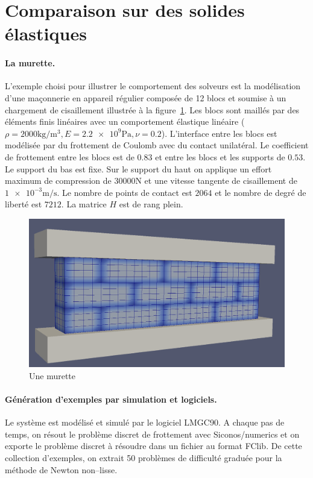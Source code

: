 \documentclass{CSMA2017}
\newcommand\red[1]{\textcolor{red}{#1}}
\begin{document}
\section{Comparaison sur des solides élastiques}

\paragraph{La murette.}
L'exemple choisi pour illustrer le comportement des solveurs est la modélisation d'une maçonnerie en appareil régulier composée de 12 blocs et soumise à un chargement de cisaillement illustrée à la figure~\ref{fig:LowWall_FEM}. Les blocs sont maillés par des éléments finis linéaires avec un comportement élastique linéaire ($\rho= \num{2000}\si{\kilogram\per\cubic\metre}, E=\num{2.2e+9}\si{\pascal} ,\nu = 0.2$). L'interface entre les blocs est modélisée par du frottement de Coulomb avec du contact unilatéral.  Le coefficient de frottement entre les blocs est de $0.83$ et entre les blocs et les supports de $0.53$. Le support du bas est fixe. Sur le support du haut on applique un effort  maximum de compression de $30000 \si{\newton}$ et une vitesse tangente de cisaillement de $\num{1e-3}\si{\meter\per\second}$.
\marginpar{\red{verifier la description. nombre et type d'éléments}} Le nombre de points de contact est $2064$ et le nombre de degré de liberté est $7212$. La matrice $H$ est de rang plein.
\begin{figure}[htbp]
  \centering
  \includegraphics[height=0.2\textheight]{./figure/LowWall_FEM.png}
  \caption{Une murette}
  \label{fig:LowWall_FEM}
\end{figure}

\paragraph{Génération d'exemples par simulation et logiciels.}
Le système est modélisé et simulé par le logiciel LMGC90. A chaque pas de temps, on résout le problème discret de frottement avec Siconos/numerics et on exporte le problème discret à résoudre dans un fichier au format FClib. De cette collection d'exemples, on extrait  50 problèmes de difficulté graduée pour la méthode de Newton non--lisse.
\end{document}
